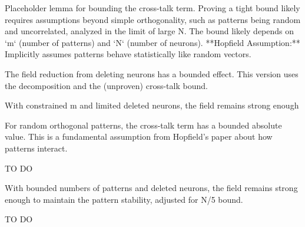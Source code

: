 \begin{lemma}\label{bound_cross_talk_term}
Placeholder lemma for bounding the cross-talk term.
Proving a tight bound likely requires assumptions beyond simple orthogonality,
such as patterns being random and uncorrelated, analyzed in the limit of large N.
The bound likely depends on `m` (number of patterns) and `N` (number of neurons).
**Hopfield Assumption:** Implicitly assumes patterns behave statistically like random vectors.
\end{lemma}

\begin{lemma}\label{deleted_field_bound}
The field reduction from deleting neurons has a bounded effect.
This version uses the decomposition and the (unproven) cross-talk bound.
\end{lemma}

\begin{lemma}\label{field_remains_sufficient}
\leanok
With constrained m and limited deleted neurons, the field remains strong enough
\end{lemma}

\begin{lemma}\label{bound_cross_talk_term_abs}
\leanok
For random orthogonal patterns, the cross-talk term has a bounded absolute value.
This is a fundamental assumption from Hopfield's paper about how patterns interact.
\end{lemma}

\begin{lemma}\label{deleted_field_product_bound}
TO DO
\end{lemma}

\begin{lemma}\label{field_remains_sufficient_for_N_div_5}
With bounded numbers of patterns and deleted neurons, the field remains strong enough
    to maintain the pattern stability, adjusted for N/5 bound.
\end{lemma}

\begin{lemma}\label{hebbian_deleted_threshold_is_zero}
TO DO
\end{lemma}

